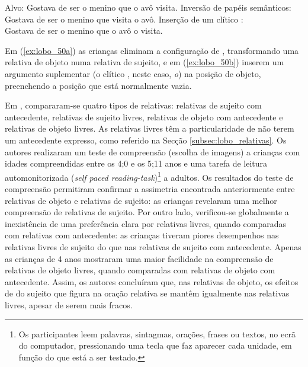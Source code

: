 \documentclass[output=paper]{LSP/langsci}
\begin{document}
\ea\label{ex:lobo_50} Alvo: Gostava de ser o menino que o avô visita.
\ea\label{ex:lobo_50a} Inversão de papéis semânticos:\\Gostava de ser o menino que visita o avô.
\ex\label{ex:lobo_50b} Inserção de um clítico :\\Gostava de ser o menino que o avô o visita.
\zl

Em (\ref{ex:lobo_50a}) as crianças eliminam a configuração de , transformando uma relativa de objeto numa relativa de sujeito, e em (\ref{ex:lobo_50b}) inserem um argumento suplementar (o clítico , neste caso, \textit{o}) na posição de objeto, preenchendo a posição que está normalmente vazia.

Em \citet{costa_etal2012}, compararam-se quatro tipos de relativas: relativas de sujeito com antecedente, relativas de sujeito livres, relativas de objeto com antecedente e relativas de objeto livres. As relativas livres têm a particularidade de não terem um antecedente expresso, como referido na Secção \ref{subsec:lobo_relativas}. Os autores realizaram um teste de compreensão (escolha de imagens) a crianças com idades compreendidas entre os 4;0 e os 5;11 anos e uma tarefa de leitura automonitorizada (\textit{self paced reading-task})\footnote{Os participantes leem palavras, sintagmas, orações, frases ou textos, no ecrã do computador, pressionando uma tecla que faz aparecer cada unidade, em função do que está a ser testado.} a adultos. Os resultados do teste de compreensão permitiram confirmar a assimetria encontrada anteriormente entre relativas de objeto e relativas de sujeito: as crianças revelaram uma melhor compreensão de relativas de sujeito. Por outro lado, verificou-se globalmente a inexistência de uma preferência clara por relativas livres, quando comparadas com relativas com antecedente: as crianças tiveram piores desempenhos nas relativas livres de sujeito do que nas relativas de sujeito com antecedente. Apenas as crianças de 4 anos mostraram uma maior facilidade na compreensão de relativas de objeto livres, quando comparadas com relativas de objeto com antecedente. Assim, os autores concluíram que, nas relativas de objeto, os efeitos de  do sujeito que figura na oração relativa se mantêm igualmente nas relativas livres, apesar de serem mais fracos.
\end{document}
